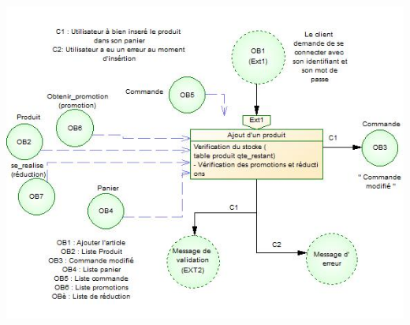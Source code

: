 \documentclass[12pt]{report}
\begin{document}
\begin{spacing}{1.2}
\centerline{\includegraphics{mct_ajout.jpg}}

\end{spacing}
\end{document}
